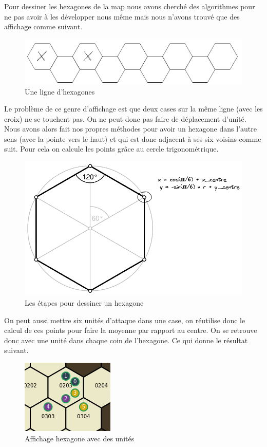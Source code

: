 Pour dessiner les hexagones de la map nous avons cherché des algorithmes pour ne pas avoir à les développer nous même mais nous n'avons trouvé que des affichage comme suivant.

\begin{figure}[H]
    \centering
    \includegraphics[scale=0.3]{data/hexmap_exemple.png}
    \caption{Une ligne d'hexagones}
\end{figure}

 Le problème de ce genre d'affichage est que deux cases sur la même ligne (avec les croix) ne se touchent pas. On ne peut donc pas faire de déplacement d'unité. Nous avons alors fait nos propres méthodes pour avoir un hexagone dans l'autre sens (avec la pointe vers le haut) et qui est donc adjacent à ses six voisins comme suit. Pour cela on calcule les points grâce au cercle trigonométrique.
 
\begin{figure}[H]
    \centering
    \includegraphics[scale=0.3]{data/hexagon.png}
    \caption{Les étapes pour dessiner un hexagone}
\end{figure}

 On peut aussi mettre six unités d'attaque dans une case, on réutilise donc le calcul de ces points pour faire la moyenne par rapport au centre. On se retrouve donc avec une unité dans chaque coin de l'hexagone. Ce qui donne le résultat suivant.
 
\begin{figure}[H]
    \centering
    \includegraphics[scale=.7]{data/hexagon_with_units.png}
    \caption{Affichage hexagone avec des unités}
\end{figure}

